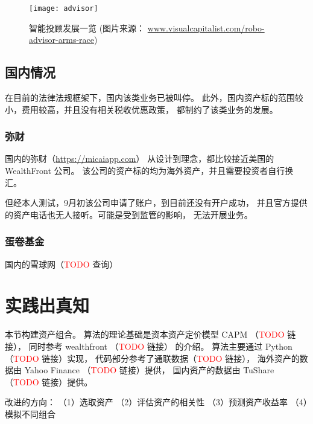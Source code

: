 \documentclass[a4paper, 11pt, UTF8]{report}
\begin{document}
\begin{figure}[htbp!]
        \centering
        \texttt{[image: advisor]}
        \caption{智能投顾发展一览\newline
                (图片来源：
                \underline{www.visualcapitalist.com/robo-advisor-arms-race})}
        \label{fig:adviosr}
\end{figure}

\section{国内情况}

在目前的法律法规框架下，国内该类业务已被叫停。
此外，国内资产标的范围较小，费用较高，并且没有相关税收优惠政策，
都制约了该类业务的发展。

\subsection{弥财}

国内的弥财（\underline{https://micaiapp.com}）
从设计到理念，都比较接近美国的 WealthFront 公司。
该公司的资产标的均为海外资产，并且需要投资者自行换汇。

但经本人测试，9月初该公司申请了账户，到目前还没有开户成功，
并且官方提供的资产电话也无人接听。可能是受到监管的影响，
无法开展业务。

\subsection{蛋卷基金}

国内的雪球网（\textcolor{red}{TODO} 查询）


\chapter{实践出真知}


本节构建资产组合。
算法的理论基础是资本资产定价模型 CAPM （\textcolor{red}{TODO} 链接），
同时参考 wealthfront （\textcolor{red}{TODO} 链接） 的介绍。
算法主要通过 Python （\textcolor{red}{TODO} 链接）实现，
代码部分参考了通联数据（\textcolor{red}{TODO} 链接），
海外资产的数据由 Yahoo Finance （\textcolor{red}{TODO} 链接）提供，
国内资产的数据由 TuShare （\textcolor{red}{TODO} 链接）提供。

改进的方向：
（1）选取资产
（2）评估资产的相关性
（3）预测资产收益率
（4）模拟不同组合
\end{document}
